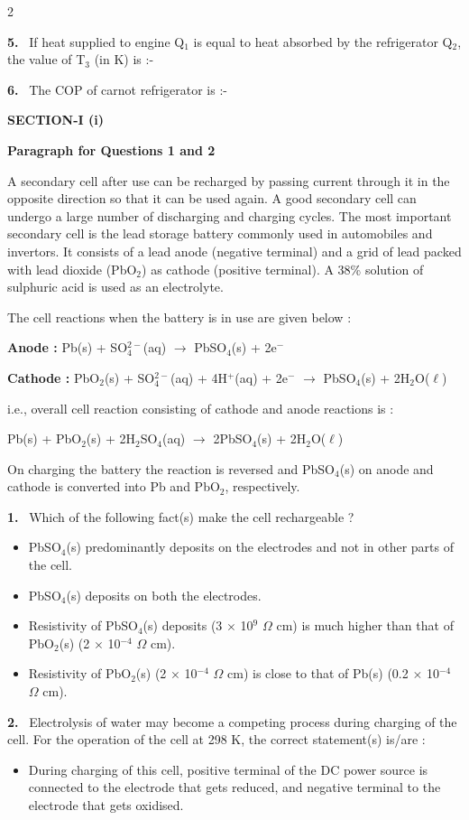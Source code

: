 \documentclass[10pt]{extarticle}
\newcommand{\partsec}[2]{\par\medskip\noindent{\large\bfseries PART-#1: #2}\par\smallskip}
\newcommand{\sect}[1]{\par\smallskip\noindent\textbf{#1}\par}
\newcommand{\qn}[1]{\par\smallskip\noindent\textbf{#1.}~}
\newcommand{\paraq}[2]{\par\smallskip\noindent\textbf{Paragraph for Questions #1 and #2}\par}
\newenvironment{qoptions}{\begin{itemize}[leftmargin=1.8em,itemsep=1pt,topsep=2pt,label={}]}{\end{itemize}}
\newcommand{\opt}[2]{\item[(#1)] #2}
\begin{document}
\begin{multicols}{2}
\qn{5} If heat supplied to engine Q$_1$ is equal to heat absorbed by the refrigerator Q$_2$, the value of T$_3$ (in K) is :-\par
\qn{6} The COP of carnot refrigerator is :-\par
\raggedcolumns
\partsec{2}{CHEMISTRY}
\sect{SECTION-I (i)}
\paraq{1}{2}A secondary cell after use can be recharged by passing current through it in the opposite direction so that it can be used again. A good secondary cell can undergo a large number of discharging and charging cycles. The most important secondary cell is the lead storage battery commonly used in automobiles and invertors. It consists of a lead anode (negative terminal) and a grid of lead packed with lead dioxide (PbO$_2$) as cathode (positive terminal). A 38\% solution of sulphuric acid is used as an electrolyte.\par
The cell reactions when the battery is in use are given below :\par
\textbf{Anode :} Pb(s) + SO$_4^{2-}$(aq) $\rightarrow$ PbSO$_4$(s) + 2e$^-$\par
\textbf{Cathode :} PbO$_2$(s) + SO$_4^{2-}$(aq) + 4H$^+$(aq) + 2e$^-$ $\rightarrow$ PbSO$_4$(s) + 2H$_2$O($\ell$)\par
i.e., overall cell reaction consisting of cathode and anode reactions is :\par
Pb(s) + PbO$_2$(s) + 2H$_2$SO$_4$(aq) $\rightarrow$ 2PbSO$_4$(s) + 2H$_2$O($\ell$)\par
On charging the battery the reaction is reversed and PbSO$_4$(s) on anode and cathode is converted into Pb and PbO$_2$, respectively.\par
\qn{1} Which of the following fact(s) make the cell rechargeable ?
\begin{qoptions}
\opt{A}{PbSO$_4$(s) predominantly deposits on the electrodes and not in other parts of the cell.}
\opt{B}{PbSO$_4$(s) deposits on both the electrodes.}
\opt{C}{Resistivity of PbSO$_4$(s) deposits (3 $\times$ 10$^9$ $\Omega$ cm) is much higher than that of PbO$_2$(s) (2 $\times$ 10$^{-4}$ $\Omega$ cm).}
\opt{D}{Resistivity of PbO$_2$(s) (2 $\times$ 10$^{-4}$ $\Omega$ cm) is close to that of Pb(s) (0.2 $\times$ 10$^{-4}$ $\Omega$ cm).}
\end{qoptions}
\qn{2} Electrolysis of water may become a competing process during charging of the cell. For the operation of the cell at 298 K, the correct statement(s) is/are :
\begin{qoptions}
\opt{A}{During charging of this cell, positive terminal of the DC power source is connected to the electrode that gets reduced, and negative terminal to the electrode that gets oxidised.}

\end{qoptions}
\end{multicols}
\end{document}
